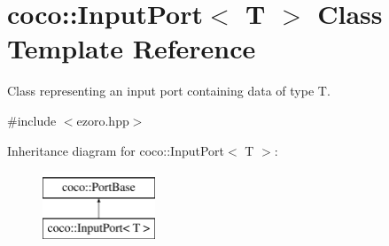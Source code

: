 \hypertarget{classcoco_1_1_input_port}{\section{coco\-:\-:Input\-Port$<$ T $>$ Class Template Reference}
\label{classcoco_1_1_input_port}
}


Class representing an input port containing data of type T.  




{\ttfamily \#include $<$ezoro.\-hpp$>$}

Inheritance diagram for coco\-:\-:Input\-Port$<$ T $>$\-:\begin{figure}[H]
\begin{center}
\leavevmode
\includegraphics[height=2.000000cm]{classcoco_1_1_input_port}
\end{center}
\end{figure}
